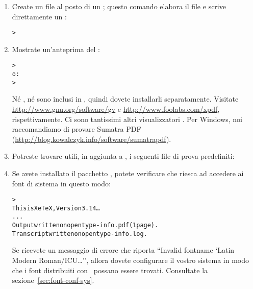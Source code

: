 \documentclass{article}
\begin{document}
\begin{enumerate}
\item Create un file  al posto di un \dvi{}; questo comando
elabora il file  e scrive direttamente un :
\begin{alltt}
> 
\end{alltt}

\item Mostrate un'anteprima del :
\begin{alltt}
> 
\textrm{o:}
> 
\end{alltt}
Né , né  sono inclusi in \TL{}, quindi dovete
installarli separatamente. Visitate \url{http://www.gnu.org/software/gv} e
\url{http://www.foolabs.com/xpdf}, rispettivamente. Ci sono tantissimi
altri visualizzatori . Per Windows, noi raccomandiamo di provare
Sumatra PDF (\url{http://blog.kowalczyk.info/software/sumatrapdf}).

\item Potreste trovare utili, in aggiunta a , i
seguenti file di prova predefiniti:


\item Se avete installato il pacchetto , potete verificare che
riesca ad accedere ai font di sistema in questo modo:
\begin{alltt}
> 
This is XeTeX, Version 3.14\dots
...
Output written on opentype-info.pdf (1 page).
Transcript written on opentype-info.log.
\end{alltt}

Se ricevete un messaggio di errore che riporta ``Invalid fontname `Latin
Modern Roman/ICU\dots'', allora dovete configurare il vostro sistema in
modo che i font distribuiti con \TL\ possano essere trovati. Consultate la
sezione~\ref{sec:font-conf-sys}.

\end{enumerate}
\end{document}
